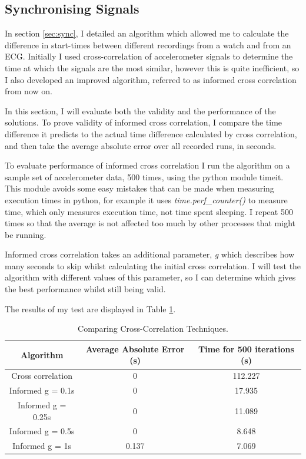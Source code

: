 \documentclass[12pt,a4paper,twoside,openany]{report}
\begin{document}
\subsection{Synchronising Signals} \label{sec:evaluate-sync}

In section \ref{sec:sync}, I detailed an algorithm which allowed me to
calculate the difference in start-times between different recordings from a
watch and from an ECG. Initially I used cross-correlation of accelerometer signals to
determine the time at which the signals are the most similar, however this is
quite inefficient, so I also developed an improved algorithm, referred to as
informed cross correlation from now on.

In this section, I will evaluate both the validity and the performance of the
solutions. To prove validity of informed cross correlation, I compare the
time difference it predicts to the actual time difference calculated by cross
correlation, and then take the average absolute error over all recorded runs,
in seconds. 

To evaluate performance of informed cross correlation I run the
algorithm on a sample set of accelerometer data, 500 times, using the python
module timeit. This module avoids some easy mistakes that can be made when
measuring execution times in python, for example it uses
\emph{time.perf\_counter()} to measure time, which only measures execution
time, not time spent sleeping. I repeat 500 times so that the average is not
affected too much by other processes that might be running.

Informed cross correlation takes an additional parameter,
\emph{g} which describes how many seconds to skip whilst
calculating the initial cross correlation. I will test the algorithm with different
values of this parameter, so I can determine which gives the best performance
whilst still being valid. 

The results of my test are displayed in Table \ref{table:cross-correlation}. 

\begin{table}
\centering
\caption{Comparing Cross-Correlation Techniques.}
\label{table:cross-correlation}
\begin{tabular}{ | c | c | c | }
	\hline
	Algorithm & Average Absolute Error (s) & Time for 500
	iterations (s)\\ 
	\hline
	Cross correlation & 0 & 112.227 \\  
	Informed g = 0.1s & 0 & 17.935 \\    
	Informed g = 0.25s & 0 & 11.089 \\    
	Informed g = 0.5s & 0 & 8.648 \\    
	Informed g = 1s & 0.137 & 7.069  \\
	\hline
   \end{tabular}
\end{table}
\end{document}
